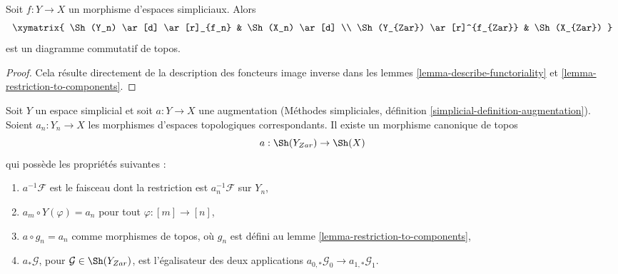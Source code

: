 \begin{lemma}
\label{lemma-restriction-to-components-functorial}
Soit $f : Y \to X$ un morphisme d'espaces simpliciaux. Alors
$$
\xymatrix{
\Sh(Y_n) \ar[d] \ar[r]_{f_n} & \Sh(X_n) \ar[d] \\
\Sh(Y_{Zar}) \ar[r]^{f_{Zar}} & \Sh(X_{Zar})
}
$$
est un diagramme commutatif de topos.
\end{lemma}

\begin{proof}
Cela résulte directement de la description des foncteurs image inverse dans les
lemmes \ref{lemma-describe-functoriality} et
\ref{lemma-restriction-to-components}.
\end{proof}

\begin{lemma}
\label{lemma-augmentation}
Soit $Y$ un espace simplicial et soit $a : Y \to X$ une augmentation
(Méthodes simpliciales, définition \ref{simplicial-definition-augmentation}).
Soient $a_n : Y_n \to X$ les morphismes d'espaces topologiques correspondants.
Il existe un morphisme canonique de topos
$$
a : \Sh(Y_{Zar}) \to \Sh(X)
$$
qui possède les propriétés suivantes :
\begin{enumerate}
\item $a^{-1}\mathcal{F}$ est le faisceau dont la restriction est $a_n^{-1}\mathcal{F}$
sur $Y_n$,
\item $a_m \circ Y(\varphi) = a_n$ pour tout $\varphi : [m] \to [n]$,
\item $a \circ g_n = a_n$ comme morphismes de topos, où
$g_n$ est défini au lemme \ref{lemma-restriction-to-components},
\item $a_*\mathcal{G}$, pour $\mathcal{G} \in \Sh(Y_{Zar})$,
est l'égalisateur des deux applications
$a_{0, *}\mathcal{G}_0 \to a_{1, *}\mathcal{G}_1$.
\end{enumerate}
\end{lemma}

